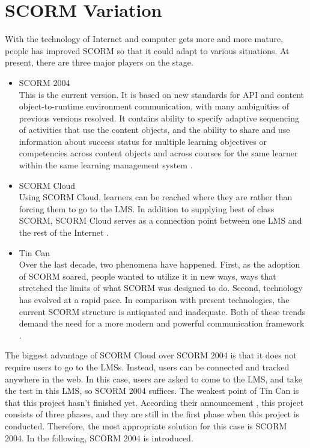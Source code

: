 \section{SCORM Variation}
\label{sec:scorm_variation}
With the technology of Internet and computer gets more and more mature, people has improved SCORM so that it could adapt to various situations. At 
present, there are three major players on the stage.
\begin{itemize}
	\item SCORM 2004 \\
		This is the current version. It is based on new standards for API and content object-to-runtime environment communication, with many 
		ambiguities of previous versions resolved. It contains ability to specify adaptive sequencing of activities that use the content objects, and 
		the ability to share and use information about success status for multiple learning objectives or competencies across content objects and 
		across courses for the same learner within the same learning management system \cite{scorm_overview}.
	\item SCORM Cloud \\
		Using SCORM Cloud, learners can be reached where they are rather than forcing them to go to the LMS. In addition to supplying best of class 
		SCORM, SCORM Cloud serves as a connection point between one LMS and the rest of the Internet \cite{scorm_cloud}.
	\item Tin Can \\
		Over the last decade, two phenomena have happened. First, as the adoption of SCORM soared, people wanted to utilize it in new ways, ways that 
		stretched the limits of what SCORM was designed to do. Second, technology has evolved at a rapid pace. In comparison with present 
		technologies, the current SCORM structure is antiquated and inadequate. Both of these trends demand the need for a more modern and powerful 
		communication framework \cite{tin_can}.
\end{itemize}

The biggest advantage of SCORM Cloud over SCORM 2004 is that it does not require users to go to the LMSs. Instead, users can be connected and tracked 
anywhere in the web. In this case, users are asked to come to the LMS, and take the test in this LMS, so SCORM 2004 suffices. The weakest point of 
Tin Can is that this project hasn't finished yet. According their announcement \cite{tin_can}, this project consists of three phases, and they are 
still in the first phase when this project is conducted. Therefore, the most appropriate solution for this case is SCORM 2004. In the following, 
SCORM 2004 is introduced.
